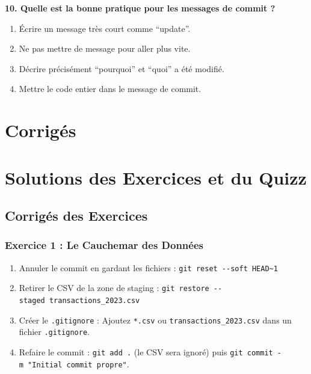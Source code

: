 \documentclass[
  letterpaper,
  DIV=11,
  numbers=noendperiod]{scrreprt}
\providecommand{\tightlist}{%
  \setlength{\itemsep}{0pt}\setlength{\parskip}{0pt}}
\begin{document}
\textbf{10. Quelle est la bonne pratique pour les messages de commit ?}

\begin{enumerate}
\def\labelenumi{\Alph{enumi})}
\tightlist
\item
  Écrire un message très court comme ``update''.
\item
  Ne pas mettre de message pour aller plus vite.
\item
  Décrire précisément ``pourquoi'' et ``quoi'' a été modifié.
\item
  Mettre le code entier dans le message de commit.
\end{enumerate}


\section{Corrigés}\label{corriguxe9s}


\section{Solutions des Exercices et du
Quizz}\label{solutions-des-exercices-et-du-quizz}

\subsection{Corrigés des Exercices}\label{corriguxe9s-des-exercices}

\subsubsection{Exercice 1 : Le Cauchemar des
Données}\label{exercice-1-le-cauchemar-des-donnuxe9es-1}

\begin{enumerate}
\def\labelenumi{\arabic{enumi}.}
\tightlist
\item
  Annuler le commit en gardant les fichiers :
  \texttt{git\ reset\ -\/-soft\ HEAD\textasciitilde{}1}
\item
  Retirer le CSV de la zone de staging :
  \texttt{git\ restore\ -\/-staged\ transactions\_2023.csv}
\item
  Créer le \texttt{.gitignore} : Ajoutez \texttt{*.csv} ou
  \texttt{transactions\_2023.csv} dans un fichier \texttt{.gitignore}.
\item
  Refaire le commit : \texttt{git\ add\ .} (le CSV sera ignoré) puis
  \texttt{git\ commit\ -m\ "Initial\ commit\ propre"}.
\end{enumerate}
\end{document}
